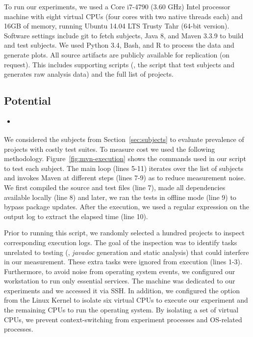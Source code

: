 To run our experiments, we used a Core i7-4790 (3.60 GHz) Intel
processor machine with eight virtual CPUs (four cores with two native
threads each) and 16GB of memory, running Ubuntu 14.04 LTS Trusty Tahr
(64-bit version).  Software settings include git to fetch
subjects, Java 8, and Maven 3.3.9 to build and test subjects. We used
Python 3.4, Bash, and R to process the data and generate plots.  All
source artifacts are publicly available for replication (on
request).  This includes supporting
scripts (\eg, the script that test subjects and generates raw analysis
data) and the full list of projects. 

\subsection{Potential}
\label{sec:rqA}
\label{sec:rqB}

\begin{itemize}
    \item \textbf{\RQA}
\end{itemize}

We considered the \numSubjs{} subjects from Section~\ref{sec:subjects}
to evaluate prevalence of projects with costly test suites.  To
measure cost we used the following methodology.  Figure~\ref{fig:mvn-execution} shows
the commands used in our script to test each subject. The main loop
(lines 5-11) iterates over the list of subjects and invokes Maven at
different steps (lines 7-9) as to reduce measurement noise.  We first
compiled the source and test files (line 7), made all dependencies
available locally (line 8) and later, we ran the tests in offline mode
(line 9) to bypass package updates. After the execution, we used a
regular expression on the output log to extract the elapsed time (line
10).

Prior to running this script, we randomly selected a hundred projects
to inspect corresponding execution logs.  The goal of the inspection
was to identify tasks unrelated to testing (\eg, \emph{javadoc}
generation and static analysis) that could interfere in our
measurement.  These extra tasks were ignored from execution (lines
1-3).  Furthermore, to avoid noise from operating system events, we
configured our workstation to run only essential services.  The
machine was dedicated to our experiments and we accessed it via
SSH. In addition, we configured the  option from the
Linux Kernel \cite{linux-kernel} to isolate six virtual CPUs to
execute our experiment and the remaining CPUs to run the operating
system. By isolating a set of virtual CPUs, we prevent
context-switching from experiment processes and OS-related
processes.

